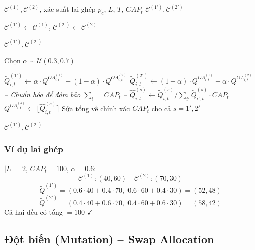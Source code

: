 \documentclass[12pt]{article}
\newcommand{\QOA}{Q^{OA}}
\begin{document}
\begin{algorithm}[H]
\caption{BLX-$\alpha$ Crossover cho phân bổ hàng hóa}
\label{alg:crossover}
\begin{algorithmic}[1]
\Require $\mathcal{C}^{(1)}, \mathcal{C}^{(2)}$, xác suất lai ghép $p_c$, $L$, $T$, $CAP_t$
\Ensure $\mathcal{C}^{(1')}, \mathcal{C}^{(2')}$

\State $\mathcal{C}^{(1')} \gets \mathcal{C}^{(1)}$, \; $\mathcal{C}^{(2')} \gets \mathcal{C}^{(2)}$

 \Return $\mathcal{C}^{(1')}, \mathcal{C}^{(2')}$
\EndIf

\State Chọn $\alpha \sim \mathcal{U}(0.3, 0.7)$

    \State $\widetilde{Q}^{(1')}_{i,t} \gets \alpha \cdot \QOA^{(1)}_{i,t} + (1-\alpha) \cdot \QOA^{(2)}_{i,t}$
    \State $\widetilde{Q}^{(2')}_{i,t} \gets (1-\alpha) \cdot \QOA^{(1)}_{i,t} + \alpha \cdot \QOA^{(2)}_{i,t}$
  \EndFor
  \State \textit{-- Chuẩn hóa để đảm bảo $\sum_i = CAP_t$ --}
    \State $\widehat{Q}^{(s)}_{i,t} \gets \widetilde{Q}^{(s)}_{i,t} / \sum_{i'} \widetilde{Q}^{(s)}_{i',t} \cdot CAP_t$
    \State $\QOA^{(s)}_{i,t} \gets \lfloor \widehat{Q}^{(s)}_{i,t} \rceil$
  \EndFor
  \State Sửa tổng về chính xác $CAP_t$ cho cả $s = 1', 2'$
\EndFor

\State \Return $\mathcal{C}^{(1')}, \mathcal{C}^{(2')}$
\end{algorithmic}
\end{algorithm}

\subsubsection*{Ví dụ lai ghép}

$|L|=2$, $CAP_t = 100$, $\alpha = 0.6$:
\[
  \mathcal{C}^{(1)}: (40, 60) \quad \mathcal{C}^{(2)}: (70, 30)
\]
\[
  \widetilde{Q}^{(1')} = (0.6\cdot40 + 0.4\cdot70,\; 0.6\cdot60 + 0.4\cdot30) = (52, 48)
\]
\[
  \widetilde{Q}^{(2')} = (0.4\cdot40 + 0.6\cdot70,\; 0.4\cdot60 + 0.6\cdot30) = (58, 42)
\]
Cả hai đều có tổng $= 100$ $\checkmark$

\subsection{Đột biến (Mutation) -- Swap Allocation}
\end{document}
